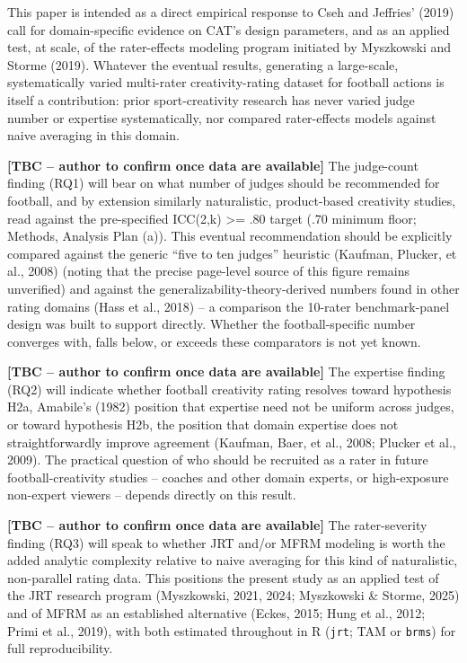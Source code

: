 \documentclass[
  12pt,
]{article}
\begin{document}
This paper is intended as a direct empirical response to Cseh and
Jeffries' (2019) call for domain-specific evidence on CAT's design
parameters, and as an applied test, at scale, of the rater-effects
modeling program initiated by Myszkowski and Storme (2019). Whatever the
eventual results, generating a large-scale, systematically varied
multi-rater creativity-rating dataset for football actions is itself a
contribution: prior sport-creativity research has never varied judge
number or expertise systematically, nor compared rater-effects models
against naive averaging in this domain.

\textbf{{[}TBC -- author to confirm once data are available{]}} The
judge-count finding (RQ1) will bear on what number of judges should be
recommended for football, and by extension similarly naturalistic,
product-based creativity studies, read against the pre-specified
ICC(2,k) \textgreater= .80 target (.70 minimum floor; Methods, Analysis
Plan (a)). This eventual recommendation should be explicitly compared
against the generic ``five to ten judges'' heuristic (Kaufman, Plucker,
et al., 2008) (noting that the precise page-level source of this figure
remains unverified) and against the generalizability-theory-derived
numbers found in other rating domains (Hass et al., 2018) -- a
comparison the 10-rater benchmark-panel design was built to support
directly. Whether the football-specific number converges with, falls
below, or exceeds these comparators is not yet known.

\textbf{{[}TBC -- author to confirm once data are available{]}} The
expertise finding (RQ2) will indicate whether football creativity rating
resolves toward hypothesis H2a, Amabile's (1982) position that expertise
need not be uniform across judges, or toward hypothesis H2b, the
position that domain expertise does not straightforwardly improve
agreement (Kaufman, Baer, et al., 2008; Plucker et al., 2009). The
practical question of who should be recruited as a rater in future
football-creativity studies -- coaches and other domain experts, or
high-exposure non-expert viewers -- depends directly on this result.

\textbf{{[}TBC -- author to confirm once data are available{]}} The
rater-severity finding (RQ3) will speak to whether JRT and/or MFRM
modeling is worth the added analytic complexity relative to naive
averaging for this kind of naturalistic, non-parallel rating data. This
positions the present study as an applied test of the JRT research
program (Myszkowski, 2021, 2024; Myszkowski \& Storme, 2025) and of MFRM
as an established alternative (Eckes, 2015; Hung et al., 2012; Primi et
al., 2019), with both estimated throughout in R (\texttt{jrt}; TAM or
\texttt{brms}) for full reproducibility.
\end{document}
